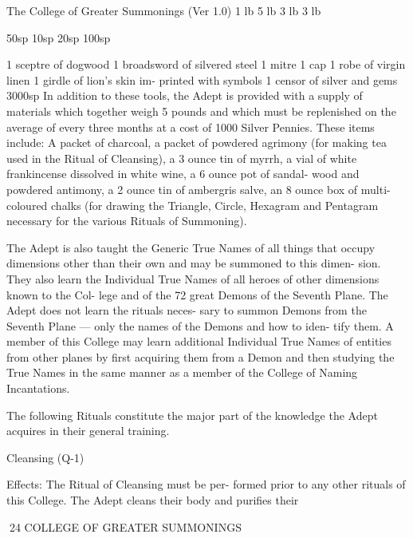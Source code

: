 \begin{Chapter}{The College of Greater Summonings (Ver 1.0)}
1 lb 
5 lb 
3 lb 
3 lb 

50sp 
10sp 
20sp 
100sp 

1 sceptre of dogwood 
1 broadsword of silvered 
steel 
1 mitre 
1 cap 
1 robe of virgin linen 
1 girdle of lion’s skin im-
printed with symbols 
1 censor of silver and gems 
3000sp 
In  addition  to  these  tools,  the  Adept  is  provided 
with a supply of materials which together weigh 5 
pounds  and  which  must  be  replenished  on  the 
average  of  every  three  months  at  a  cost  of  1000 
Silver  Pennies.  These  items  include:  A  packet  of 
charcoal,  a  packet  of  powdered  agrimony  (for 
making  tea  used  in  the  Ritual  of  Cleansing),  a  3 
ounce  tin  of  myrrh,  a  vial  of  white  frankincense 
dissolved  in  white  wine,  a  6  ounce  pot  of  sandal-
wood  and  powdered  antimony,  a  2  ounce  tin  of 
ambergris salve, an 8 ounce box of multi-coloured 
chalks (for drawing the Triangle, Circle, Hexagram 
and Pentagram necessary for the various Rituals of 
Summoning). 

The  Adept  is  also  taught  the  Generic  True  Names 
of  all  things  that  occupy  dimensions  other  than 
their  own  and  may  be  summoned  to  this  dimen-
sion. They also learn the Individual True Names of 
all  heroes  of  other  dimensions  known  to  the  Col-
lege  and  of  the  72  great  Demons  of  the  Seventh 
Plane.  The  Adept  does  not  learn  the  rituals  neces-
sary  to  summon  Demons  from  the  Seventh  Plane 
— only the names of the Demons and how to iden-
tify  them.  A  member  of  this  College  may  learn 
additional  Individual  True  Names  of  entities  from 
other planes by first acquiring them from a Demon 
and  then  studying  the  True  Names  in  the  same 
manner  as  a  member  of  the  College  of  Naming 
Incantations. 

The  following  Rituals  constitute  the  major  part  of 
the  knowledge  the  Adept  acquires  in  their  general 
training. 

Cleansing (Q-1) 

Effects:  The  Ritual  of  Cleansing  must  be  per-
formed  prior  to  any  other  rituals  of  this  College. 
The  Adept  cleans  their  body  and  purifies  their 

24 COLLEGE OF GREATER SUMMONINGS 


\end{Chapter}
